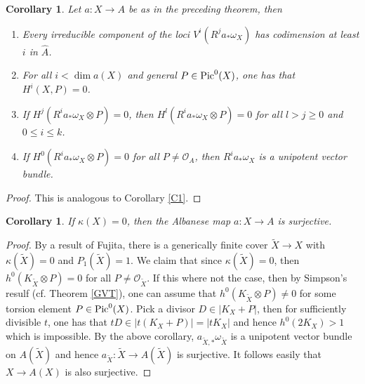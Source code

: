 \documentclass[10pt]{amsart}
\newtheorem{cor}[thm]{Corollary}
\newcommand\Pic{{\text{\rm Pic}}}
\newcommand\alb{{ a}}
\newcommand\lra{\longrightarrow}
\newcommand\Alb{{ A}}
\newcommand\ot{{\otimes}}
\newcommand\OO{{\mathcal{O}}}
\begin{document}
 \begin{cor} \label{C2}
Let $\alb:X\lra \Alb$ be as in the preceding theorem, then
\begin{enumerate}
\item Every irreducible component of the loci $V^i(R^ja_*\omega _X)$ has
codimension at least $i$ in $\hat {A}$.

 \item  For all $i<\dim \alb (X)$ and general $P\in \Pic ^0(X)$,
 one has that $H^i(X,P)=0$.

 \item If $H^j(R^i\alb _*\omega _X\ot P)=0$, then 
$H^l(R^i\alb _*\omega _X\ot P)
=0$
 for all $l>j\geq 0$ and $0\leq i\leq k$.
\item If $H^0( R^i\alb _*\omega _X\ot P)=0$ for all $P\ne \OO _A$,
then $ R^i\alb _*\omega _X$ is a unipotent vector bundle.
\end{enumerate} 
\end{cor}
 \begin{proof} This is analogous to Corollary \ref{C1}.
 \end{proof}
 \begin{cor} \label{k0}
If $\kappa (X)=0$, then the Albanese map $\alb :X \lra A$
is surjective.
 \end{cor}
 \begin{proof} By a result of Fujita,
there is a generically finite cover $\tilde {X}\lra X$ 
with $\kappa (\tilde {X}
)=0$ and $P_1(\tilde {X})=1$. We claim that since $\kappa (\tilde {X}
)=0$, then $h^0(K_{\tilde {X}}\ot P)=0$ for all $P\ne \OO _{\tilde {X}}$.
If this where not the case, then by Simpson's resulf (cf. Theorem
\ref{GVT}), one can assume that $h^0(K_{\tilde {X}}\ot P)\ne 0$
for some torsion element $P\in \Pic ^0(X)$. Pick a divisor 
$D\in |K_X+P|$, then for sufficiently divisible $t$, one has
that $tD\in |t(K_X+P)|=|tK_X|$ and hence $h^0(2K_X)>1$ which is
impossible. 
By the above corollary, $\alb _{\tilde {X},*}\omega _{\tilde {X}}$ is
a unipotent vector bundle on $\Alb (\tilde {X})$ and hence
$ {\alb _{\tilde {X}}}:\tilde {X}\lra \Alb (\tilde {X})$ is surjective.
It follows easily that $X\lra A(X)$ is also surjective.
  \end{proof}
\end{document}
